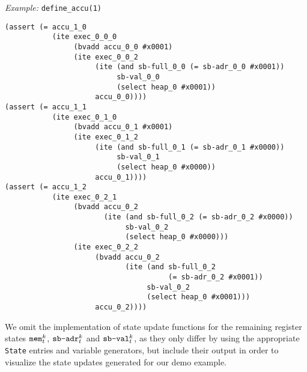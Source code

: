 \noindent
\emph{Example:} \lstinline[style=c++]{define_accu(1)}

\begin{lstlisting}[language=SMTLib]
(assert (= accu_1_0
           (ite exec_0_0_0
                (bvadd accu_0_0 #x0001)
                (ite exec_0_0_2
                     (ite (and sb-full_0_0 (= sb-adr_0_0 #x0001))
                          sb-val_0_0
                          (select heap_0 #x0001))
                     accu_0_0))))
(assert (= accu_1_1
           (ite exec_0_1_0
                (bvadd accu_0_1 #x0001)
                (ite exec_0_1_2
                     (ite (and sb-full_0_1 (= sb-adr_0_1 #x0000))
                          sb-val_0_1
                          (select heap_0 #x0000))
                     accu_0_1))))
(assert (= accu_1_2
           (ite exec_0_2_1
                (bvadd accu_0_2
                       (ite (and sb-full_0_2 (= sb-adr_0_2 #x0000))
                            sb-val_0_2
                            (select heap_0 #x0000)))
                (ite exec_0_2_2
                     (bvadd accu_0_2
                            (ite (and sb-full_0_2
                                      (= sb-adr_0_2 #x0001))
                                 sb-val_0_2
                                 (select heap_0 #x0001)))
                     accu_0_2))))
\end{lstlisting}


\noindent
We omit the implementation of state update functions for the remaining register states $\texttt{mem}^k_t$, $\texttt{sb-adr}^k_t$ and $\texttt{sb-val}^k_t$, as they only differ by using the appropriate \texttt{State} entries and variable generators, but include their output in order to visualize the state updates generated for our demo example.


